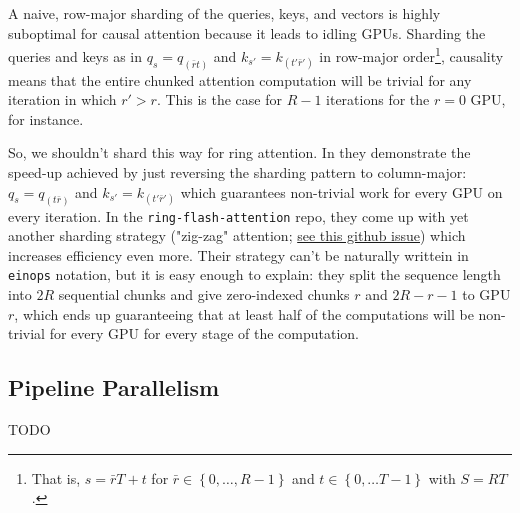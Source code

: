 A naive, row-major sharding of the queries, keys, and vectors is highly suboptimal for causal
attention because it leads to idling GPUs. Sharding the queries and keys as in $ q _{ s } =q _{
(\bar{r}t) } $ and $ k _{ s' } = k _{ (t'\bar{r}') } $ in row-major order\footnote{That is, $ s = \bar{r}T
+ t $ for $ \bar{r} \in \left \{ 0, \ldots , R-1 \right \} $ and $ t \in \left \{ 0, \ldots  T-1
\right \} $ with $ S=RT $.}, causality means that the entire chunked attention computation will be
trivial for any iteration in which $ r'> r $. This is the case for $ R-1 $ iterations for the $ r=0
$ GPU, for instance.

So, we shouldn't shard this way for ring attention. In \cite{brandon2023stripedattentionfasterring}
they demonstrate the speed-up achieved by just reversing the sharding pattern to column-major: $ q
_{ s } =q _{ (t\bar{r}) } $ and $ k _{ s' } = k _{ (t'\bar{r}') } $ which guarantees non-trivial
work for every GPU on every iteration. In the \texttt{ring-flash-attention} repo, they come up with
yet another sharding strategy ("zig-zag" attention;
\href{https://github.com/zhuzilin/ring-flash-attention/issues/2}{see this github issue}) which
increases efficiency even more. Their strategy can't be naturally writtein in \texttt{einops}
notation, but it is easy enough to explain: they split the sequence length into $ 2R $ sequential
chunks and give zero-indexed chunks $ r $ and $ 2R -r -1 $ to GPU $ r $, which ends up guaranteeing
that at least half of the computations will be non-trivial for every GPU for every stage of the
computation.



\subsection{Pipeline Parallelism \label{subsec_pipe_parallelism}}

TODO
